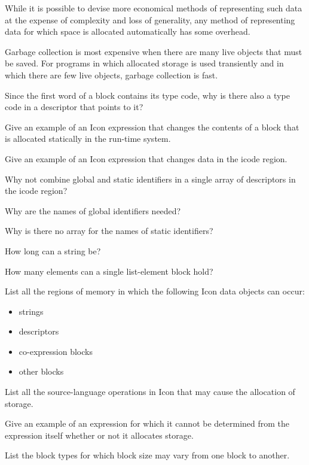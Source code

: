 While it is possible to devise more economical methods of representing
such data at the expense of complexity and loss of generality, any
method of representing data for which space is allocated automatically
has some overhead.

Garbage collection is most expensive when there are many live objects
that must be saved. For programs in which allocated storage is used
transiently and in which there are few live objects, garbage
collection is fast.


 Since the first word of a block contains its type
code, why is there also a type code in a descriptor that points to it?

 Give an example of an Icon expression that
changes the contents of a block that is allocated statically in the
run-time system.

 Give an example of an Icon expression that
changes data in the icode region.

 Why not combine global and static identifiers in
a single array of descriptors in the icode region?

 Why are the names of global identifiers needed?

 Why is there no array for the names of static identifiers?

 How long can a string be?

 How many elements can a single list-element block
hold?

 List all the regions of memory in which the
following Icon data objects can occur:
\begin{itemize}
\item 
strings
\item 
descriptors
\item 
co-expression blocks
\item 
other blocks
\end{itemize}

 List all the source-language operations in Icon
that may cause the allocation of storage.

 Give an example of an expression for which it
cannot be determined from the expression itself whether or not it
allocates storage.

 List the block types for which block size may
vary from one block to another.

